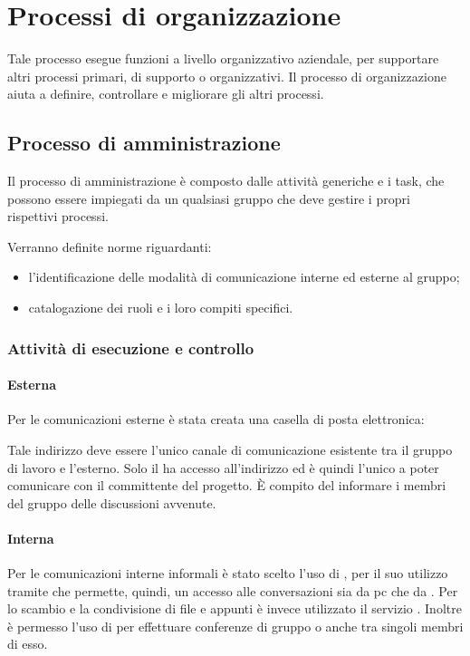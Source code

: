\documentclass[12pt,a4paper]{article}
\begin{document}
\newpage

\section{Processi di organizzazione}
Tale processo esegue funzioni a livello organizzativo aziendale, per supportare altri processi primari, di supporto o organizzativi.
Il processo di organizzazione aiuta a definire, controllare e migliorare gli altri processi.

\subsection{Processo di amministrazione}
Il processo di amministrazione è composto dalle attività generiche e i task, che possono essere impiegati da un qualsiasi gruppo che deve gestire i propri rispettivi processi. 

Verranno definite norme riguardanti:
\begin{itemize}
	\item l'identificazione delle modalità di comunicazione interne ed esterne al gruppo;
	\item catalogazione dei ruoli e i loro compiti specifici.
\end{itemize}

\subsubsection{Attività di esecuzione e controllo}

\paragraph{Esterna}
Per le comunicazioni esterne è stata creata una casella di posta elettronica:
\begin{center}
	\href{mailto:\mailGruppo{}}{\mailGruppo{}}
\end{center}
Tale indirizzo deve essere l'unico canale di comunicazione esistente tra il gruppo di lavoro e l'esterno. Solo il \PM{} ha accesso all'indirizzo ed è quindi l'unico a poter comunicare con il committente del progetto. È compito del \PM{} informare i membri del gruppo delle discussioni avvenute.

\paragraph{Interna}
Per le comunicazioni interne informali è stato scelto l'uso di , per il suo utilizzo tramite  che permette, quindi, un accesso alle conversazioni sia da pc che da . Per lo scambio e la condivisione di file e appunti è invece utilizzato il servizio  . Inoltre è permesso l'uso di  per effettuare conferenze di gruppo o anche tra singoli membri di esso.
\end{document}
